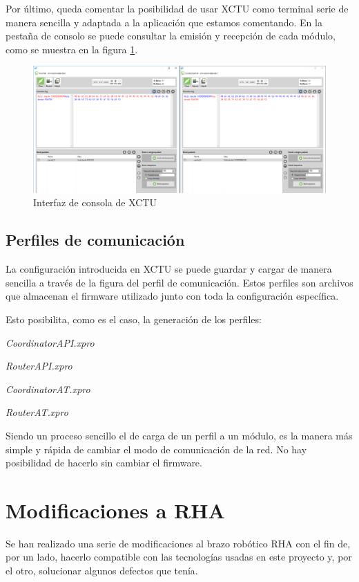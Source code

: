 Por último, queda comentar la posibilidad de usar XCTU como terminal serie de manera sencilla y adaptada a la aplicación que estamos comentando. En la pestaña de consolo se puede consultar la emisión y recepción de cada módulo, como se muestra en la figura \ref{fig:XCTUconsola}.

\begin{figure}[bth]
\centering
\includegraphics[width=1.1\textwidth, frame]{figuras/XCTUConsola.png}
\caption{Interfaz de consola de XCTU}
\label{fig:XCTUconsola}
\end{figure}


\subsection{Perfiles de comunicación}

La configuración introducida en XCTU se puede guardar y cargar de manera sencilla a través de la figura del perfil de comunicación. Estos perfiles son archivos que almacenan el firmware utilizado junto con toda la configuración específica.

Esto posibilita, como es el caso, la generación de los perfiles:

\textit{CoordinatorAPI.xpro}

\textit{RouterAPI.xpro}

\textit{CoordinatorAT.xpro}

\textit{RouterAT.xpro}

Siendo un proceso sencillo el de carga de un perfil a un módulo, es la manera más simple y rápida de cambiar el modo de comunicación de la red. No hay posibilidad de hacerlo sin cambiar el firmware.


\section{Modificaciones a RHA}

Se han realizado una serie de modificaciones al brazo robótico RHA con el fin de, por un lado, hacerlo compatible con las tecnologías usadas en este proyecto y, por el otro, solucionar algunos defectos que tenía.

